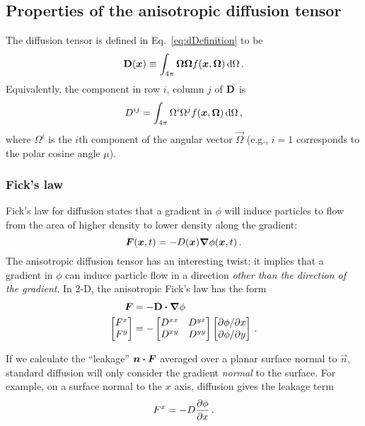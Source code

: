 \subsection{Properties of the anisotropic diffusion tensor}
The diffusion tensor is defined in Eq.~\eqref{eq:dDefinition} to be
\begin{equation*}
  \mathbf{D}(\bm{x}) \equiv \int_{4\pi} \bm{\Omega} \bm{\Omega}
  f(\bm{x}, \bm{\Omega}) \mathop{}\!\mathrm{d}\Omega \,.
\end{equation*}
Equivalently, the component in row $i$, column $j$ of $\mathbf{D}$ is
\begin{equation}\label{eq:dij}
  D^{ij} = \int_{4\pi} \Omega^i \Omega^j
  f(\bm{x}, \bm{\Omega}) \mathop{}\!\mathrm{d}\Omega \,,
\end{equation}
where $\Omega^i$ is the $i$th component of the angular vector $\vec{\Omega}$
(e.g., $i=1$ corresponds to the polar cosine angle $\mu$).

\subsubsection{Fick's law}
Fick's law for diffusion states that a gradient in $\phi$ will induce particles
to flow from the area of higher density to lower density along the gradient:
\begin{equation*}
  \bm{F}(\bm{x},t) = - D(\bm{x}) \bm{\nabla} \phi(\bm{x},t)\,.
\end{equation*}
The anisotropic diffusion tensor has an interesting twist: it implies that a
gradient in $\phi$ can induce
particle flow in a direction \emph{other than the direction of the gradient}. In
2-D, the anisotropic Fick's law has the form
\begin{align*}
  \bm{F} &= - \mathbf{D} \bm{\cdot} \bm{\nabla} \phi
  \\
  \begin{bmatrix}
    F^x \\
    F^y
  \end{bmatrix}
  &=
  -
  \begin{bmatrix}
    D^{xx} & D^{yx} \\
    D^{xy} & D^{yy}
  \end{bmatrix}
  \begin{bmatrix}
    {\partial \phi}/{\partial x} \\
    {\partial \phi}/{\partial y}
  \end{bmatrix} \,.
\end{align*}

If we calculate the ``leakage'' $\bm{n} \bm{\cdot} \bm{F}$ averaged over a planar
surface normal to $\vec{n}$, standard diffusion will only consider the gradient
\emph{normal} to the surface. For example, on a surface normal to the $x$ axis,
diffusion gives the leakage term
\begin{equation*}
  F^x = - D \frac{\partial \phi}{\partial x}\,.
\end{equation*}

